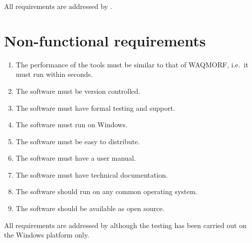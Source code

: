 All requirements are addressed by \dfastmi.

\section{Non-functional requirements}

\begin{enumerate}
\item The performance of the tools must be similar to that of WAQMORF, i.e.~it must run within seconds.
\item The software must be version controlled.
\item The software must have formal testing and support.
\item The software must run on Windows.
\item The software must be easy to distribute.
\item The software must have a user manual.
\item The software must have technical documentation.

\item The software should run on any common operating system.
\item The software should be available as open source.
\end{enumerate}

All requirements are addressed by \dfastmi although the testing has been carried out on the Windows platform only.
